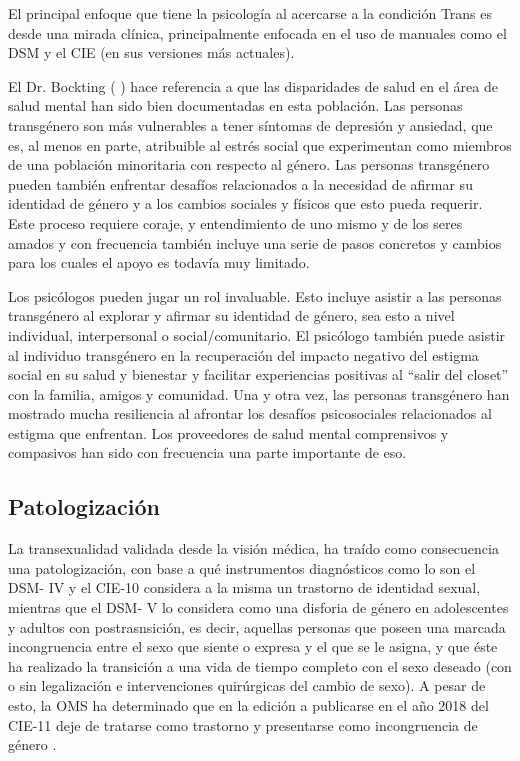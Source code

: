 El principal enfoque que tiene la psicología al acercarse a la condición Trans
es desde una mirada clínica, principalmente enfocada en el uso de manuales como
el DSM y el CIE (en sus versiones más actuales).

El Dr. Bockting (\cite*{Alonso2015} \citeauthor[c.p.][]{Alonso2015}) hace
referencia a que las disparidades de salud en el área de salud mental han sido
bien documentadas en esta población. Las personas transgénero son más
vulnerables a tener síntomas de depresión y ansiedad, que es, al menos en parte,
atribuible al estrés social que experimentan como miembros de una población
minoritaria con respecto al género. Las personas transgénero pueden también
enfrentar desafíos relacionados a la necesidad de afirmar su identidad de género
y a los cambios sociales y físicos que esto pueda requerir. Este proceso
requiere coraje, y entendimiento de uno mismo y de los seres amados y con
frecuencia también incluye una serie de pasos concretos y cambios para los
cuales el apoyo es todavía muy limitado.

Los psicólogos pueden jugar un rol invaluable. Esto incluye asistir a las
personas transgénero al explorar y afirmar su identidad de género, sea esto a
nivel individual, interpersonal o social/comunitario. El psicólogo también puede
asistir al individuo transgénero en la recuperación del impacto negativo del
estigma social en su salud y bienestar y facilitar experiencias positivas al
“salir del closet” con la familia, amigos y comunidad. Una y otra vez, las
personas transgénero han mostrado mucha resiliencia al afrontar los desafíos
psicosociales relacionados al estigma que enfrentan. Los proveedores de salud
mental comprensivos y compasivos han sido con frecuencia una parte importante de
eso.

\subsection{Patologización}

La transexualidad validada desde la visión médica, ha traído como consecuencia
una patologización, con base a qué instrumentos diagnósticos como lo son el DSM-
IV y el CIE-10 considera a la misma un trastorno de identidad sexual, mientras
que el DSM- V \parencite{APA} lo considera como una disforia de género en
adolescentes y adultos con postrasnsición, es decir, aquellas personas que
poseen una marcada incongruencia entre el sexo que siente o expresa y el que se
le asigna, y que éste ha realizado la transición a una vida de tiempo completo
con el sexo deseado (con o sin legalización e intervenciones quirúrgicas del
cambio de sexo). A pesar de esto, la OMS ha determinado que en la edición a
publicarse en el año 2018 del CIE-11 deje de tratarse como trastorno y
presentarse como incongruencia de género \parencite{Borraz2017}.

